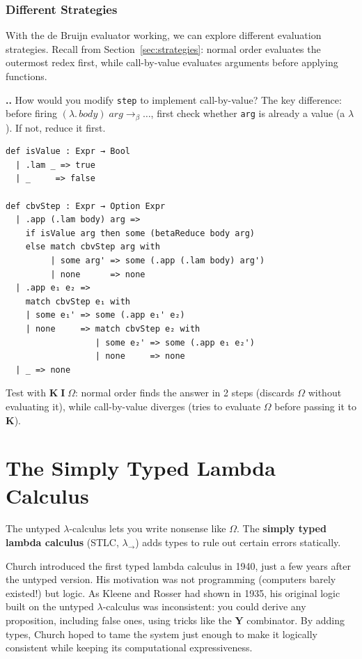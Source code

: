 \documentclass[11pt,a4paper]{article}
\newcounter{exercise}[section]
\renewcommand{\theexercise}{\thesection.\arabic{exercise}}
\theoremstyle{definition}
\newcommand{\lam}{\lambda}
\newcommand{\reduce}{\longrightarrow_\beta}
\begin{document}
\subsubsection{Different Strategies}

With the de Bruijn evaluator working, we can explore different evaluation
strategies. Recall from Section~\ref{sec:strategies}: normal order evaluates
the outermost redex first, while call-by-value evaluates arguments before
applying functions.

\begin{exercisebox}
\textbf{\theexercise.}\; How would you modify \texttt{step} to implement call-by-value? The key difference: before firing $(\lam.\,\mathit{body})\;\mathit{arg} \reduce \ldots$, first check whether \texttt{arg} is already a value (a $\lam$). If not, reduce it first.
\end{exercisebox}

\begin{verbatim}
def isValue : Expr → Bool
  | .lam _ => true
  | _     => false

def cbvStep : Expr → Option Expr
  | .app (.lam body) arg =>
    if isValue arg then some (betaReduce body arg)
    else match cbvStep arg with
         | some arg' => some (.app (.lam body) arg')
         | none      => none
  | .app e₁ e₂ =>
    match cbvStep e₁ with
    | some e₁' => some (.app e₁' e₂)
    | none     => match cbvStep e₂ with
                  | some e₂' => some (.app e₁ e₂')
                  | none     => none
  | _ => none
\end{verbatim}

Test with $\mathbf{K}\;\mathbf{I}\;\Omega$: normal order finds the answer in
2 steps (discards $\Omega$ without evaluating it), while call-by-value diverges
(tries to evaluate $\Omega$ before passing it to $\mathbf{K}$).

\section{The Simply Typed Lambda Calculus}\label{sec:stlc}

The untyped $\lam$-calculus lets you write nonsense like $\Omega$. The
\textbf{simply typed lambda calculus} (STLC, $\lam_\to$) adds types to rule
out certain errors statically.

Church introduced the first typed lambda calculus in 1940, just a few years
after the untyped version. His motivation was not programming (computers barely
existed!) but logic. As Kleene and Rosser had shown in 1935, his original
logic built on the untyped $\lam$-calculus was inconsistent: you could derive any proposition,
including false ones, using tricks like the $\mathbf{Y}$ combinator. By adding
types, Church hoped to tame the system just enough to make it logically
consistent while keeping its computational expressiveness.
\end{document}
